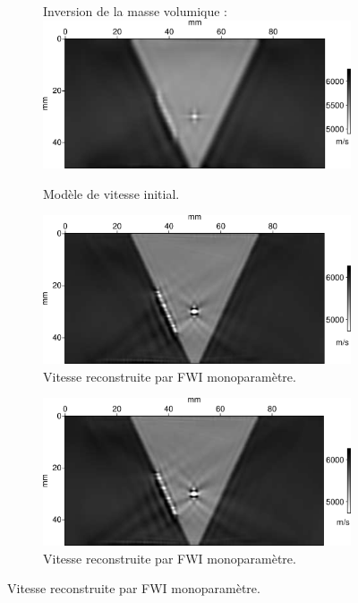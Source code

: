 \begin{figure}[p]
\begin{changemargin}{-2cm}{-2cm}
\begin{subfigure}[b]{0.29\textwidth}
			\centering
			Inversion de la masse volumique :  \\[0.2cm]
			\includegraphics[width=\textwidth]{img/mono_param/vp_smooth.png}
			\caption{Modèle de vitesse initial.}
		\end{subfigure}
		\begin{subfigure}[b]{0.29\textwidth}
			\includegraphics[width=\textwidth]{img/mono_param/vp_final_uni.png}
			\caption{Vitesse reconstruite par FWI monoparamètre.}
		\end{subfigure}
		\begin{subfigure}[b]{0.29\textwidth}
			\includegraphics[width=\textwidth]{img/mono_param/vp_final_smooth.png}
			\caption{Vitesse reconstruite par FWI monoparamètre.}

\end{subfigure}
\end{changemargin}
\end{figure}
